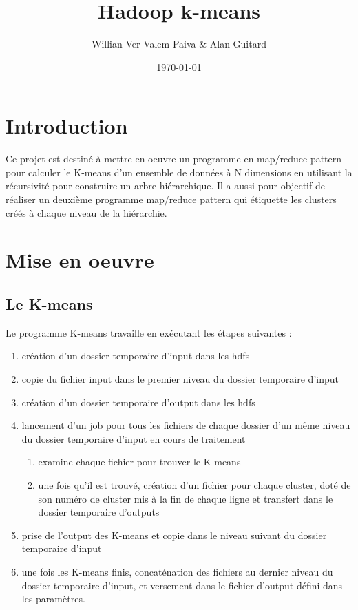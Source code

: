\documentclass[12pt]{article}
\author{Willian Ver Valem Paiva \& Alan Guitard}
\date{\today}
\title{Hadoop k-means}
\begin{document}
\maketitle
\tableofcontents



\section{Introduction}
\label{sec:org2c21b8d}

Ce projet est destiné à mettre en oeuvre un programme en map/reduce pattern pour calculer le K-means
d'un ensemble de données à N dimensions en utilisant la récursivité pour construire un arbre hiérarchique.
Il a aussi pour objectif de réaliser un deuxième programme  map/reduce pattern qui étiquette les clusters
créés à chaque niveau de la hiérarchie. 


\section{Mise en oeuvre}
\label{sec:orga0824aa}

\subsection{Le K-means}
\label{sec:org3d8c243}

Le programme K-means travaille en exécutant les étapes suivantes :

\begin{enumerate}
\item création d'un dossier temporaire d'input dans les hdfs
\item copie du fichier input dans le premier niveau du dossier temporaire d'input
\item création d'un dossier temporaire d'output dans les hdfs
\item lancement d'un job pour tous les fichiers de chaque dossier d'un même niveau du dossier temporaire d'input en cours de traitement    
\begin{enumerate}
\item examine chaque fichier pour trouver le K-means
\item une fois qu'il est trouvé, création d'un fichier pour chaque cluster, doté de son numéro de cluster mis à la fin de chaque ligne et transfert dans le dossier temporaire d'outputs
\end{enumerate}
\item prise de l'output des K-means et copie dans le niveau suivant du dossier temporaire d'input
\item une fois les K-means finis, concaténation des fichiers au dernier niveau du dossier temporaire d'input, et versement dans le fichier
d'output défini dans les paramètres.
\end{enumerate}
\end{document}
